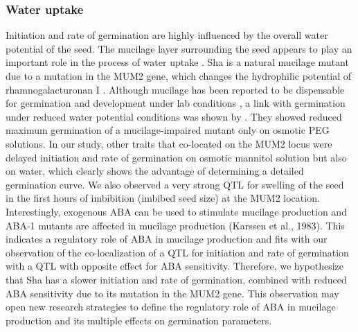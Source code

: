 \subsubsection{Water uptake}
Initiation and rate of germination are highly influenced by the overall water potential of the seed. The 
mucilage layer surrounding the seed appears to play an important role in the process of water uptake 
\cite{Penfield:2001}. Sha is a natural mucilage mutant due to a mutation in the MUM2 gene, which changes 
the hydrophilic potential of rhamnogalacturonan I \cite{Macquet:2007}. Although mucilage has been reported 
to be dispensable for germination and development under lab conditions \cite{Arsovski:2010}, a link with 
germination under reduced water potential conditions was shown by \cite{Penfield:2001}. They showed 
reduced maximum germination of a mucilage-impaired mutant only on osmotic PEG solutions. In our study, 
other traits that co-located on the MUM2 locus were delayed initiation and rate of germination on osmotic
mannitol solution but also on water, which clearly shows the advantage of determining a detailed 
germination curve. We also observed a very strong QTL for swelling of the seed in the first hours of 
imbibition (imbibed seed size) at the MUM2 location. Interestingly, exogenous ABA can be used to 
stimulate mucilage production and ABA-1 mutants are affected in mucilage production (Karssen et al., 1983). 
This indicates a regulatory role of ABA in mucilage production and fits with our observation of the 
co-localization of a QTL for initiation and rate of germination with a QTL with opposite effect for ABA 
sensitivity. Therefore, we hypothesize that Sha has a slower initiation and rate of germination,
combined with reduced ABA sensitivity due to its mutation in the MUM2 gene. This observation may open 
new research strategies to define the regulatory role of ABA in mucilage production and its multiple 
effects on germination parameters.


